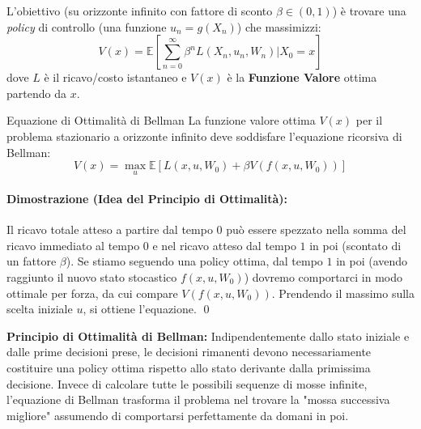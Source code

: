 \documentclass[11pt,a4paper]{article}
\begin{document}
L'obiettivo (su orizzonte infinito con fattore di sconto $\beta \in (0,1)$) è trovare una \textit{policy} di controllo (una funzione $u_n = g(X_n)$) che massimizzi:
\[ V(x) = \mathbb{E} \left[ \sum_{n=0}^\infty \beta^n L(X_n, u_n, W_n) \bigg| X_0 = x \right] \]
dove $L$ è il ricavo/costo istantaneo e $V(x)$ è la \textbf{Funzione Valore} ottima partendo da $x$.

\begin{teorema}{Equazione di Ottimalità di Bellman}{}
La funzione valore ottima $V(x)$ per il problema stazionario a orizzonte infinito deve soddisfare l'equazione ricorsiva di Bellman:
\[ V(x) = \max_u \mathbb{E} \left[ L(x, u, W_0) + \beta V(f(x, u, W_0)) \right] \]
\end{teorema}
\paragraph{Dimostrazione (Idea del Principio di Ottimalità):}
Il ricavo totale atteso a partire dal tempo $0$ può essere spezzato nella somma del ricavo immediato al tempo $0$ e nel ricavo atteso dal tempo $1$ in poi (scontato di un fattore $\beta$). Se stiamo seguendo una policy ottima, dal tempo $1$ in poi (avendo raggiunto il nuovo stato stocastico $f(x, u, W_0)$) dovremo comportarci in modo ottimale per forza, da cui compare $V(f(x, u, W_0))$. Prendendo il massimo sulla scelta iniziale $u$, si ottiene l'equazione. \qed

\begin{intuizione}
\textbf{Principio di Ottimalità di Bellman:} Indipendentemente dallo stato iniziale e dalle prime decisioni prese, le decisioni rimanenti devono necessariamente costituire una policy ottima rispetto allo stato derivante dalla primissima decisione. 
Invece di calcolare tutte le possibili sequenze di mosse infinite, l'equazione di Bellman trasforma il problema nel trovare la "mossa successiva migliore" assumendo di comportarsi perfettamente da domani in poi.
\end{intuizione}
\end{document}
